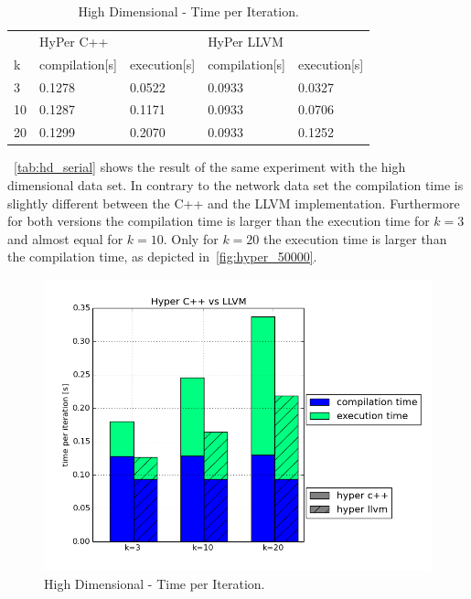 \begin{table}[htsb]
  \caption[High Dimensional - Time per Iteration]{High Dimensional - Time per Iteration.}\label{tab:hd_serial}
  \centering
  \begin{tabular}{l l l l l}
    \toprule
      & HyPer C++ & & HyPer LLVM & \\
      k & compilation[s] & execution[s] & compilation[s] & execution[s] \\
    \midrule
      3  & 0.1278 & 0.0522 & 0.0933 & 0.0327 \\
      10 & 0.1287 & 0.1171 & 0.0933 & 0.0706 \\
      20 & 0.1299 & 0.2070 & 0.0933 & 0.1252 \\
    \bottomrule
  \end{tabular}
\end{table}

~\autoref{tab:hd_serial} shows the result of the same experiment with the high dimensional data set. In contrary to the network data set the compilation time is slightly different between the C++ and the LLVM implementation. Furthermore for both versions the compilation time is larger than the execution time for $k = 3$ and almost equal for $k = 10$. Only for $k = 20$ the execution time is larger than the compilation time, as depicted in~\autoref{fig:hyper_50000}.

\begin{figure}[htsb]
  \centering
  \includegraphics[scale=0.5, trim="0cm 1.5cm 0cm 0cm"]{figures/charts/hyper_50000}
  \caption[High Dimensional - Time per Iteration]{High Dimensional - Time per Iteration.}
  \label{fig:hyper_50000}
\end{figure}

